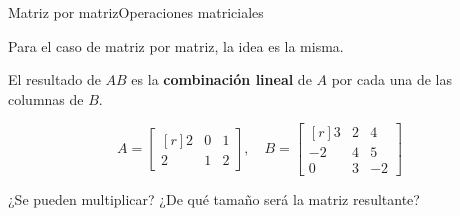 \documentclass[spanish, c]{beamer}
\begin{document}
\begin{frame}{Matriz por matriz}{Operaciones matriciales}

    Para el caso de matriz por matriz, la idea es la misma.

    \bigskip

    El resultado de $AB$ es la \textbf{combinación lineal} de $A$ por cada una de las columnas de $B$.

    \bigskip
    
    \[%
        A = %
        \begin{bmatrix*}[r]
            2 & 0 & 1 \\
            2 & 1 & 2
        \end{bmatrix*}, \quad
        B = %
        \begin{bmatrix*}[r]
            3 & 2 & 4 \\
            -2 & 4 & 5 \\
            0 & 3 & -2
        \end{bmatrix*}
    \] \pause

    \bigskip

    ¿Se pueden multiplicar? \pause ¿De qué tamaño será la matriz resultante?    

\end{frame}
\end{document}
